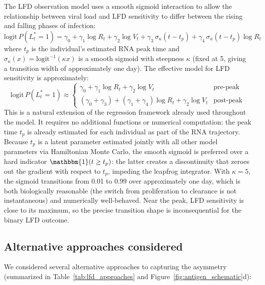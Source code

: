 \begin{appendix}
The LFD observation model uses a smooth sigmoid interaction to allow the relationship between viral load and LFD sensitivity to differ between the rising and falling phases of infection:
\begin{equation*}
    \text{logit}\,P(L_t^* = 1) = \gamma_0 + \gamma_1 \log R_t + \gamma_2 \log V_t + \gamma_3 \,\sigma_\kappa(t - t_p) + \gamma_4 \,\sigma_\kappa(t - t_p) \log R_t
\end{equation*}
where $t_p$ is the individual's estimated RNA peak time and $\sigma_\kappa(x) = \text{logit}^{-1}(\kappa x)$ is a smooth sigmoid with steepness $\kappa$ (fixed at 5, giving a transition width of approximately one day). The effective model for LFD sensitivity is approximately:
\begin{equation*}
    \text{logit}\,P(L_t^* = 1) \approx \begin{cases}
        \gamma_0 + \gamma_1 \log R_t + \gamma_2 \log V_t & \text{pre-peak} \\
        (\gamma_0 + \gamma_3) + (\gamma_1 + \gamma_4) \log R_t + \gamma_2 \log V_t & \text{post-peak}
    \end{cases}
\end{equation*}
This is a natural extension of the regression framework already used throughout the model. It requires no additional functions or numerical computation: the peak time $t_p$ is already estimated for each individual as part of the RNA trajectory. Because $t_p$ is a latent parameter estimated jointly with all other model parameters via Hamiltonian Monte Carlo, the smooth sigmoid is preferred over a hard indicator $\mathbbm{1}(t \geq t_p)$: the latter creates a discontinuity that zeroes out the gradient with respect to $t_p$, impeding the leapfrog integrator. With $\kappa = 5$, the sigmoid transitions from 0.01 to 0.99 over approximately one day, which is both biologically reasonable (the switch from proliferation to clearance is not instantaneous) and numerically well-behaved. Near the peak, LFD sensitivity is close to its maximum, so the precise transition shape is inconsequential for the binary LFD outcome.

\subsection{Alternative approaches considered}

We considered several alternative approaches to capturing the asymmetry (summarized in Table~\ref{tab:lfd_approaches} and Figure~\ref{fig:antigen_schematic}d):


\end{appendix}
